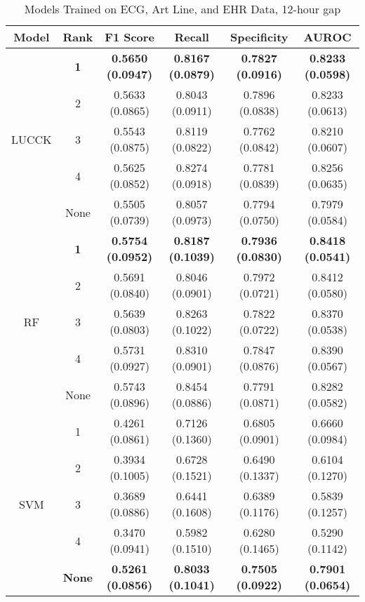 \begin{table}
    \centering
    \caption{Models Trained on ECG, Art Line, and EHR Data, 12-hour gap}
    \begin{tabularx}{\textwidth}{|C|C|C|C|C|C|}
        \hline
        Model & Rank & F1 Score & Recall & Specificity & AUROC \\
        \hline
        & \textbf{1} & \textbf{0.5650 (0.0947)} & \textbf{0.8167 (0.0879)} & \textbf{0.7827 (0.0916)} & \textbf{0.8233 (0.0598)}\\
        & 2 & 0.5633 (0.0865) & 0.8043 (0.0911) & 0.7896 (0.0838) & 0.8233 (0.0613)\\
        LUCCK & 3 & 0.5543 (0.0875) & 0.8119 (0.0822) & 0.7762 (0.0842) & 0.8210 (0.0607)\\
        & 4 & 0.5625 (0.0852) & 0.8274 (0.0918) & 0.7781 (0.0839) & 0.8256 (0.0635)\\
        & None & 0.5505 (0.0739) & 0.8057 (0.0973) & 0.7794 (0.0750) & 0.7979 (0.0584)\\
        \hline                
        & \textbf{1} & \textbf{0.5754 (0.0952)} & \textbf{0.8187 (0.1039)} & \textbf{0.7936 (0.0830)} & \textbf{0.8418 (0.0541)}\\
        & 2 & 0.5691 (0.0840) & 0.8046 (0.0901) & 0.7972 (0.0721) & 0.8412 (0.0580)\\
        RF & 3 & 0.5639 (0.0803) & 0.8263 (0.1022) & 0.7822 (0.0722) & 0.8370 (0.0538)\\
        & 4 & 0.5731 (0.0927) & 0.8310 (0.0901) & 0.7847 (0.0876) & 0.8390 (0.0567)\\
        & None & 0.5743 (0.0896) & 0.8454 (0.0886) & 0.7791 (0.0871) & 0.8282 (0.0582)\\
        \hline
        & 1 & 0.4261 (0.0861) & 0.7126 (0.1360) & 0.6805 (0.0901) & 0.6660 (0.0984)\\
        & 2 & 0.3934 (0.1005) & 0.6728 (0.1521) & 0.6490 (0.1337) & 0.6104 (0.1270)\\
        SVM & 3 & 0.3689 (0.0886) & 0.6441 (0.1608) & 0.6389 (0.1176) & 0.5839 (0.1257)\\
        & 4 & 0.3470 (0.0941) & 0.5982 (0.1510) & 0.6280 (0.1465) & 0.5290 (0.1142)\\
        & \textbf{None} & \textbf{0.5261 (0.0856)} & \textbf{0.8033 (0.1041)} & \textbf{0.7505 (0.0922)} & \textbf{0.7901 (0.0654)}\\
        \hline
    \end{tabularx} 
\end{table}
